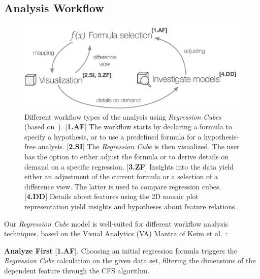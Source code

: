 \documentclass[journal]{style/vgtc} 			          %
\newcommand{\com}[1]{\textcolor{orange}{\uline{#1}}}
\begin{document}
\subsection{Analysis Workflow} \label{sec:Workflow}
\begin{figure}[htb]
 \centering
 \includegraphics[width=1.0\linewidth]{figures/workflow}
 \caption{
 Different workflow types of the analysis using \emph{Regression Cubes} (based on~\cite{Keim}).
 [\textbf{1.AF}] The workflow starts by declaring a formula to specify a hypothesis, or to use a predefined formula for a hypothesis-free analysis.
 [\textbf{2.SI}] The \emph{Regression Cube} is then visualized.
 The user has the option to either adjust the formula or to derive details on demand on a specific regression.
 [\textbf{3.ZF}] Insights into the data yield either an adjustment of the current formula or a selection of a difference view.
 The latter is used to compare regression cubes.
 [\textbf{4.DD}] Details about features using the 2D mosaic plot representation yield insights and hypotheses about feature relations.
 }
  \label{fig:Workflow}
\end{figure}
Our \emph{Regression Cube} model is well-suited for different workflow analysis techniques, based on the Visual Analytics (VA) Mantra of Keim et al.~\cite{Keim}:

\textbf{Analyze First} [\textbf{1.AF}]. Choosing an initial regression formula triggers the \emph{Regression Cube} calculation on the given data set, filtering the dimensions of the dependent feature through the CFS algorithm.
\end{document}
